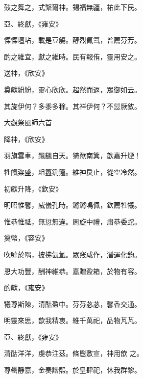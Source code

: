 \begin{pinyinscope}
 鼓之舞之，式繄爾神。錫福無疆，祐此下民。



 亞、終獻，《雍安》



 慄慄壇坫，載是豆觴。醇烈氤氳，普薦芬芳。



 酌之維宜，獻之維時。民有報侑，靈用安之。



 送神，《欣安》



 奠獻紛紛，靈心欣欣。超然而返，眾御如云。



 其旋伊何？多黍多稌。其祥伊何？不愆厥敘。



 大觀祭風師六首



 降神，《欣安》



 羽旗雲車，飄颻自天。猗歟南箕，歆嘉升煙！



 牲餼粢盛，俎簋鉶籩。維神戾止，從空冷然。



 初獻升降，《欽安》



 明昭惟馨，威儀孔時。鏘鏘鳴佩，欽薦牲犧。



 惟恭惟祗，無愆無違。周旋中禮，肅恭委蛇。



 奠幣，《容安》



 吹噓於喁，披拂氤氳。眾竅咸作，潛運化鈞。



 恩大功豐，酬神維恭。嘉贈盈箱，於物有容。



 酌獻，《雍安》



 犧尊斯陳，清酤盈中。芬芬苾苾，馨香交通。



 明靈來思，歆我精衷。維千萬祀，品物芃芃。



 亞、終獻，《雍安》



 清酤洋洋，虔恭注茲。條鬯敷宣，神用歆
 之。



 尊罍靜嘉，金奏諧熙。於皇肆祀，休我群黎。




\end{pinyinscope}
